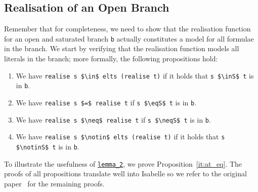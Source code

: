 \documentclass[sigplan,10pt,anonymous,review]{acmart}
\newcommand{\inS}{\in_\text{s}}
\newcommand{\notinS}{\notin_\text{s}}
\newcommand{\eqS}{=_\text{s}}
\newcommand{\neqS}{\neq_\text{s}}
\begin{document}
\subsection{Realisation of an Open Branch\label{sec:real}}
Remember that for completeness, we need to show that the realisation function for an open and saturated branch \lstinline!b! actually constitutes a model for all formulae in the branch.
We start by verifying that the realisation function models all literals in the branch; more formally, the following propositions hold: 
\begin{enumerate}[label=(\roman*)]
  \item\label{it:at_mem} We have \lstinline!realise s $\in$ elts (realise t)! if it holds that \lstinline!s $\inS$ t! is in \lstinline!b!. 
  \item\label{it:at_eq} We have \lstinline!realise s $=$ realise t! if \lstinline!s $\eqS$ t! is in \lstinline!b!.
  \item\label{it:af_eq} We have \lstinline!realise s $\neq$ realise t! if \lstinline!s $\neqS$ t! is in \lstinline!b!.
  \item\label{it:af_mem} We have \lstinline!realise s $\notin$ elts (realise t)! if it holds that \lstinline!s $\notinS$ t! is in \lstinline!b!. 
\end{enumerate}
To illustrate the usefulness of \hyperref[lst:lemma_2]{\lstinline!lemma_2!}, we prove Proposition~\ref{it:at_eq}.
The proofs of all propositions translate well into Isabelle so we refer to the original paper~\cite{new_fast_tableau} for the remaining proofs. 
\end{document}
